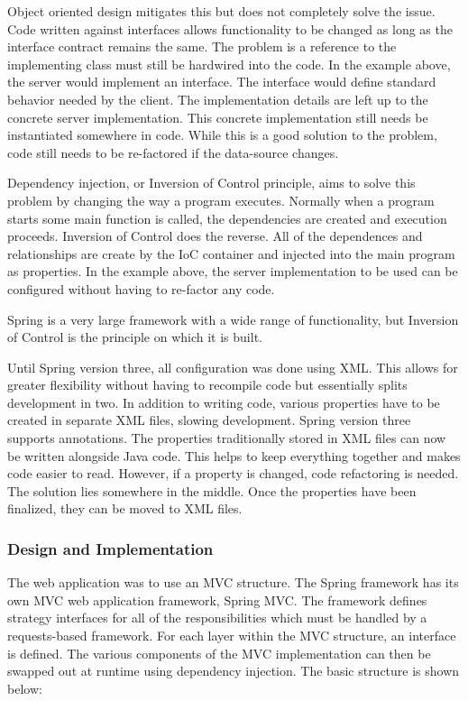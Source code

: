 \documentclass[a4paper, 11pt, titlepage]{article}
\begin{document}
Object oriented design mitigates this but does not completely solve the issue. Code written against interfaces allows functionality to be changed as long as the interface contract remains the same. The problem is a reference to the implementing class must still be hardwired into the code. In the example above, the server would implement an interface. The interface would define standard behavior needed by the client. The implementation details are left up to the concrete server implementation. This concrete implementation still needs be instantiated somewhere in code. While this is a good solution to the problem, code still needs to be re-factored if the data-source changes. 
 
Dependency injection, or Inversion of Control principle, aims to solve this problem by changing the way a program executes. Normally when a program starts some main function is called, the dependencies are created and execution proceeds. Inversion of Control does the reverse. All of the dependences and relationships are create by the IoC container and injected into the main program as properties.  In the example above, the server implementation to be used can be configured without having to re-factor any code. 
 
Spring is a very large framework with a wide range of functionality, but Inversion of Control is the principle on which it is built. 
 
Until Spring version three, all configuration was done using XML. This allows for greater flexibility without having to recompile code but essentially splits development in two. In addition to writing code, various properties have to be created in separate XML files,  slowing development. Spring version three supports annotations. The properties traditionally stored in XML files can now be written alongside Java code. This helps to keep everything together and makes code easier to read. However, if a property is changed, code refactoring is needed. The solution lies somewhere in the middle. Once the properties have been finalized, they can be moved to XML files. 
 
\cite{Spring} 
 
\subsubsection{Design and Implementation} 
 
The web application was to use an MVC structure. The Spring framework has its own MVC web application framework, Spring MVC. The framework defines strategy interfaces \cite{GOF_Strategy} for all of the responsibilities which must be handled by a requests-based framework. For each layer within the MVC structure, an interface is defined. The various components of the MVC implementation can then be swapped out at runtime using dependency injection. The basic structure is shown below:
 
\end{document}
